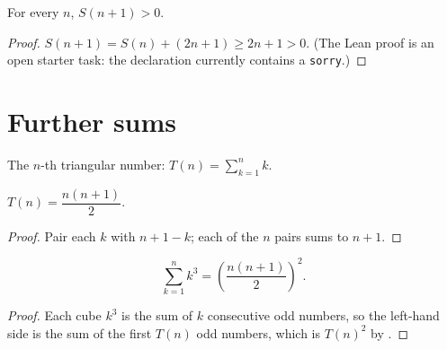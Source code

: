 \begin{lemma}\label{lemma:sumOdds-pos}
  For every $n$, $S(n+1) > 0$.
\end{lemma}
\begin{proof}
  $S(n+1) = S(n) + (2n+1) \ge 2n + 1 > 0$. (The Lean proof is an open
  starter task: the declaration currently contains a \texttt{sorry}.)
\end{proof}

\chapter{Further sums}

\begin{definition}\label{def:triangular}
  The $n$-th triangular number: $T(n) = \sum_{k=1}^{n} k$.
\end{definition}

\begin{theorem}[Gauss]\label{thm:gauss-sum}
  $T(n) = \dfrac{n(n+1)}{2}$.
\end{theorem}
\begin{proof}
  Pair each $k$ with $n + 1 - k$; each of the $n$ pairs sums to $n + 1$.
\end{proof}

\begin{theorem}\label{thm:sum-first-cubes}
  $$\sum_{k=1}^{n} k^3 = \left(\frac{n(n+1)}{2}\right)^2.$$
\end{theorem}
\begin{proof}
  Each cube $k^3$ is the sum of $k$ consecutive odd numbers, so the left-hand
  side is the sum of the first $T(n)$ odd numbers, which is $T(n)^2$ by
  .
\end{proof}
